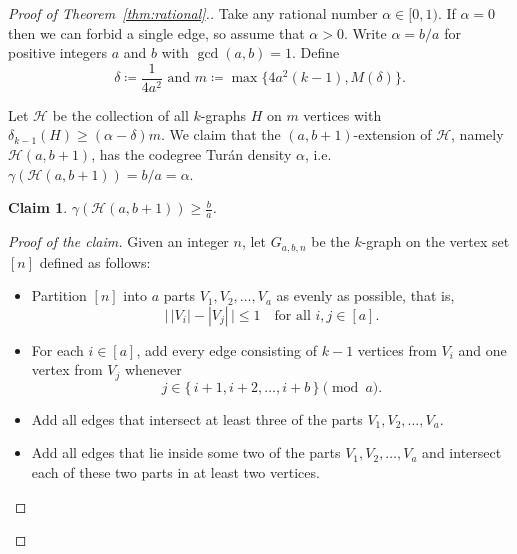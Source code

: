 \documentclass[11pt,a4paper]{article}
\newcommand{\op}[1]{\textcolor{red}{OP: #1}}
\newtheorem{claim}[definition]{Claim}
\theoremstyle{remark}
\newenvironment{poc}{\begin{proof}[Proof of the claim]\renewcommand*{\qedsymbol}{$\blacksquare$}}{\end{proof}}
\begin{document}
\begin{proof}[Proof of Theorem~\ref{thm:rational}.] Take any rational number $\alpha \in [0,1)$. If $\alpha=0$ then we can forbid a single edge, so assume that $\alpha>0$.
Write $\alpha = b/a$ for positive integers $a$ and $b$ with $\gcd(a,b) = 1$. 
Define \[\delta\coloneqq \frac{1}{4a^2} \text{ and } m \coloneqq \max \{4a^2(k-1), M(\delta)\}.\]

Let $\mathcal{H}$ be the collection of all
$k$-graphs $H$ on $m$ vertices with $\delta_{k-1}(H) \ge (\alpha-\delta)m$. We claim that the $(a,b+1)$-extension of $\mathcal{H}$, namely $\mathcal{H}(a,b+1)$, has the codegree Tur\'an density $\alpha$, i.e. $\gamma\left(\mathcal{H}(a,b+1)\right) ={b}/{a} = \alpha$. 

\begin{claim}\label{cl: upper}
    $\gamma(\mathcal{H}(a,b+1))  \ge \frac{b}{a}$.
\end{claim}
\begin{poc}
Given an integer $n$, let $G_{a,b,n}$ be the $k$-graph on the vertex set $[n]$ defined as follows:
\begin{itemize}

    \item Partition $[n]$ into $a$ parts $V_1, V_2, \dots, V_a$ as evenly as possible, that is,
    \[
        \bigl|\,|V_i| - |V_j|\,\bigr| \le 1 \quad \text{for all } i,j \in [a].
    \]

    \item For each $i \in [a]$, add every edge consisting of $k-1$ vertices from $V_i$ and 
    one vertex from $V_j$ whenever
    \[
        j \in \{\, i+1, i+2, \dots, i+b \,\} \pmod{a}.
    \]

    \item Add all edges that intersect at least three of the parts 
    $V_1, V_2, \dots, V_a$.%

    \item Add all edges that lie inside some two of the parts $V_1, V_2, \dots, V_a$ and intersect each of these two parts in at least two vertices.
\end{itemize}


\end{poc}
\end{proof}
\end{document}
